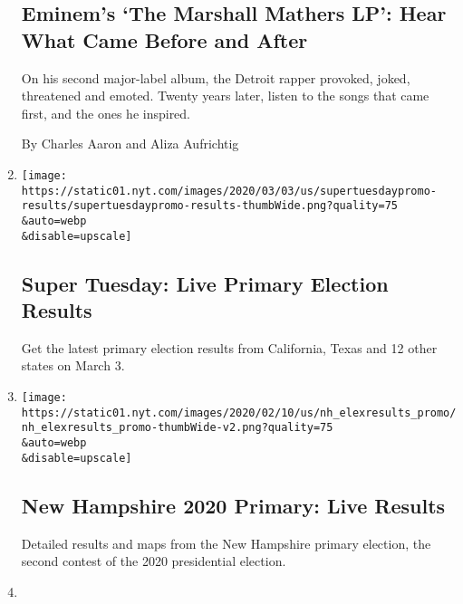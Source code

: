 \begin{enumerate}
  \hypertarget{eminems-the-marshall-mathers-lp-hear-what-came-before-and-after}{%
  \subsection{Eminem's `The Marshall Mathers LP': Hear What Came Before
  and
  After}\label{eminems-the-marshall-mathers-lp-hear-what-came-before-and-after}}

  On his second major-label album, the Detroit rapper provoked, joked,
  threatened and emoted. Twenty years later, listen to the songs that
  came first, and the ones he inspired.

  By Charles Aaron and Aliza Aufrichtig
\item
  \href{/interactive/2020/03/03/us/elections/results-super-tuesday-primary-election.html}{}

  \texttt{[image: https://static01.nyt.com/images/2020/03/03/us/supertuesdaypromo-results/supertuesdaypromo-results-thumbWide.png?quality=75\\\&auto=webp\\\&disable=upscale]}

  \hypertarget{super-tuesday-live-primary-election-results}{%
  \subsection{Super Tuesday: Live Primary Election
  Results}\label{super-tuesday-live-primary-election-results}}

  Get the latest primary election results from California, Texas and 12
  other states on March 3.
\item
  \href{/interactive/2020/02/11/us/elections/results-new-hampshire-primary-election.html}{}

  \texttt{[image: https://static01.nyt.com/images/2020/02/10/us/nh\_elexresults\_promo/nh\_elexresults\_promo-thumbWide-v2.png?quality=75\\\&auto=webp\\\&disable=upscale]}

  \hypertarget{new-hampshire-2020-primary-live-results}{%
  \subsection{New Hampshire 2020 Primary: Live
  Results}\label{new-hampshire-2020-primary-live-results}}

  Detailed results and maps from the New Hampshire primary election, the
  second contest of the 2020 presidential election.
\item
  \href{/interactive/2020/02/04/us/elections/results-iowa-caucus.html}{}


\end{enumerate}
